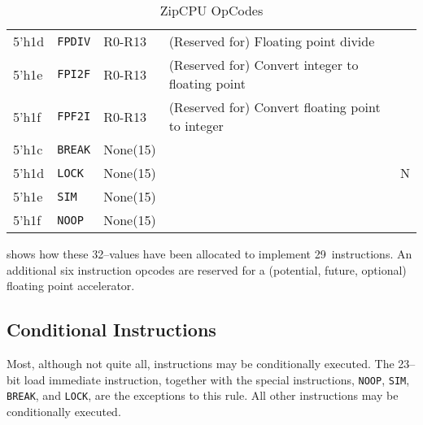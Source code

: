\documentclass{gqtekspec}
\begin{document}
\begin{table}
\begin{center}
\begin{tabular}{|l|l|l|l|c|}
5'h1d & {\tt FPDIV} & R0-R13 & (Reserved for) Floating point divide &   \\\cline{1-4}
5'h1e & {\tt FPI2F} & R0-R13 & (Reserved for) Convert integer to floating point &   \\\cline{1-4}
5'h1f & {\tt FPF2I} & R0-R13 & (Reserved for) Convert floating point to integer &   \\\hline\hline
5'h1c & {\tt BREAK} &None(15)&& \\\cline{1-4}
5'h1d & {\tt LOCK} &None(15)&& N\\\cline{1-4}
5'h1e & {\tt SIM}  &None(15)&&\\\cline{1-4}
5'h1f & {\tt NOOP} &None(15)&&\\\hline
\end{tabular}
\caption{ZipCPU OpCodes}\label{tbl:iset-opcodes}
\end{center}\end{table}
shows how these 32--values have been allocated to implement 29~instructions.
An additional six instruction opcodes are reserved for a (potential, future,
optional) floating point accelerator.

\subsection{Conditional Instructions}\label{sec:isa-cond}
Most, although not quite all, instructions may be conditionally executed.  
The 23--bit load immediate instruction, together with the special
instructions, {\tt NOOP}, {\tt SIM}, {\tt BREAK}, and {\tt LOCK}, are
the exceptions to this rule.
All other instructions may be conditionally executed.
\end{document}
